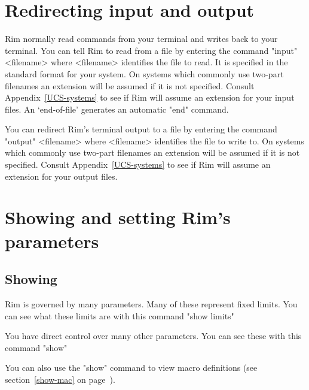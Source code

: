  
\section{Redirecting input and output}
%
Rim normally read commands from your terminal and writes back
to your terminal.  You can tell Rim to read from a file by
entering the command
\< "input" <filename>\>
where <filename> identifies the file to read.  It is specified
in the standard format for your system.
On systems which commonly use two-part filenames an extension
will be assumed if it is not specified.
Consult Appendix~\ref{UCS-systems} to
see if Rim will assume an extension for your input files.
An `end-of-file' generates an automatic "end" command.
 
You can redirect Rim's terminal output to a file by
entering the command
\< "output" <filename>\>
where <filename> identifies the file to write to.
On systems which commonly use two-part filenames an extension
will be assumed if it is not specified.
Consult Appendix~\ref{UCS-systems} to
see if Rim will assume an extension for your output files.
 
 
\section{Showing and setting Rim's parameters}
%
\subsection{Showing}
Rim is governed by many parameters.  Many of these represent
fixed limits.  You can see what these limits are with
this command
\<"show limits"\>
 
You have direct control over many other parameters.
You can see these with
this command
\<"show"\>
\label{show}
 
You can also use the "show" command to view macro definitions
(see section~\ref{show-mac} on page~\pageref{show-mac}).
 
